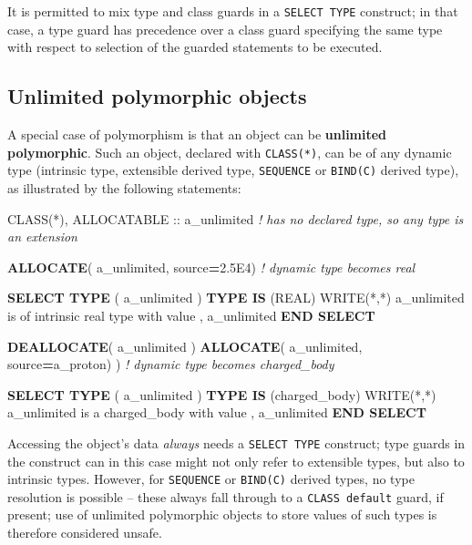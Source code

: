 \documentclass[
]{article}
\newenvironment{Shaded}{}{}
\newcommand{\CommentTok}[1]{\textcolor[rgb]{0.38,0.63,0.69}{\textit{#1}}}
\newcommand{\DataTypeTok}[1]{\textcolor[rgb]{0.56,0.13,0.00}{#1}}
\newcommand{\FloatTok}[1]{\textcolor[rgb]{0.25,0.63,0.44}{#1}}
\newcommand{\FunctionTok}[1]{\textcolor[rgb]{0.02,0.16,0.49}{#1}}
\newcommand{\KeywordTok}[1]{\textcolor[rgb]{0.00,0.44,0.13}{\textbf{#1}}}
\newcommand{\NormalTok}[1]{#1}
\newcommand{\StringTok}[1]{\textcolor[rgb]{0.25,0.44,0.63}{#1}}
\begin{document}
It is permitted to mix type and class guards in a \texttt{SELECT\ TYPE}
construct; in that case, a type guard has precedence over a class guard
specifying the same type with respect to selection of the guarded
statements to be executed.

\subsection{Unlimited polymorphic
objects}\label{unlimited-polymorphic-objects}

A special case of polymorphism is that an object can be
\textbf{unlimited polymorphic}. Such an object, declared with
\texttt{CLASS(*)}, can be of any dynamic type (intrinsic type,
extensible derived type, \texttt{SEQUENCE} or \texttt{BIND(C)} derived
type), as illustrated by the following statements:

\begin{Shaded}
\begin{Highlighting}[]
\DataTypeTok{CLASS(*)}\NormalTok{, }\DataTypeTok{ALLOCATABLE} \DataTypeTok{::}\NormalTok{ a\_unlimited  }\CommentTok{! has no declared type, so any type is an extension}

\KeywordTok{ALLOCATE}\NormalTok{( a\_unlimited, source}\KeywordTok{=}\FloatTok{2.5}\NormalTok{E4)  }\CommentTok{! dynamic type becomes real}

\KeywordTok{SELECT TYPE}\NormalTok{ ( a\_unlimited )}
\KeywordTok{TYPE IS}\NormalTok{ (}\DataTypeTok{REAL}\NormalTok{)}
   \FunctionTok{WRITE(*}\NormalTok{,}\FunctionTok{*)} \StringTok{\textquotesingle{}a\_unlimited is of intrinsic real type with value \textquotesingle{}}\NormalTok{, a\_unlimited}
\KeywordTok{END SELECT}

\KeywordTok{DEALLOCATE}\NormalTok{( a\_unlimited )}
\KeywordTok{ALLOCATE}\NormalTok{( a\_unlimited, source}\KeywordTok{=}\NormalTok{a\_proton) )  }\CommentTok{! dynamic type becomes charged\_body}

\KeywordTok{SELECT TYPE}\NormalTok{ ( a\_unlimited )}
\KeywordTok{TYPE IS}\NormalTok{ (charged\_body)}
   \FunctionTok{WRITE(*}\NormalTok{,}\FunctionTok{*)} \StringTok{\textquotesingle{}a\_unlimited is a charged\_body with value \textquotesingle{}}\NormalTok{, a\_unlimited}
\KeywordTok{END SELECT}
\end{Highlighting}
\end{Shaded}

Accessing the object's data \emph{always} needs a \texttt{SELECT\ TYPE}
construct; type guards in the construct can in this case might not only
refer to extensible types, but also to intrinsic types. However, for
\texttt{SEQUENCE} or \texttt{BIND(C)} derived types, no type resolution
is possible -- these always fall through to a \texttt{CLASS\ default}
guard, if present; use of unlimited polymorphic objects to store values
of such types is therefore considered unsafe.
\end{document}
